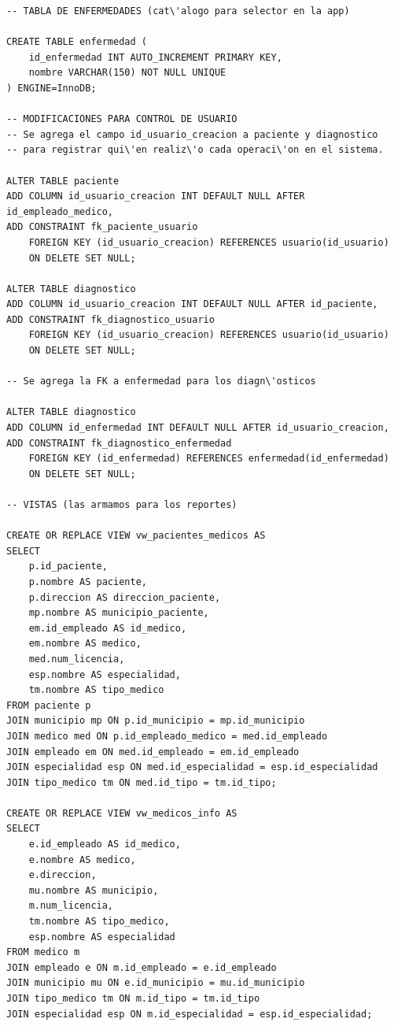 \documentclass[12pt,a4paper]{article}
\begin{document}
{\begin{verbatim}
-- TABLA DE ENFERMEDADES (cat\'alogo para selector en la app)

CREATE TABLE enfermedad (
    id_enfermedad INT AUTO_INCREMENT PRIMARY KEY,
    nombre VARCHAR(150) NOT NULL UNIQUE
) ENGINE=InnoDB;

-- MODIFICACIONES PARA CONTROL DE USUARIO
-- Se agrega el campo id_usuario_creacion a paciente y diagnostico
-- para registrar qui\'en realiz\'o cada operaci\'on en el sistema.

ALTER TABLE paciente
ADD COLUMN id_usuario_creacion INT DEFAULT NULL AFTER id_empleado_medico,
ADD CONSTRAINT fk_paciente_usuario
    FOREIGN KEY (id_usuario_creacion) REFERENCES usuario(id_usuario)
    ON DELETE SET NULL;

ALTER TABLE diagnostico
ADD COLUMN id_usuario_creacion INT DEFAULT NULL AFTER id_paciente,
ADD CONSTRAINT fk_diagnostico_usuario
    FOREIGN KEY (id_usuario_creacion) REFERENCES usuario(id_usuario)
    ON DELETE SET NULL;

-- Se agrega la FK a enfermedad para los diagn\'osticos

ALTER TABLE diagnostico
ADD COLUMN id_enfermedad INT DEFAULT NULL AFTER id_usuario_creacion,
ADD CONSTRAINT fk_diagnostico_enfermedad
    FOREIGN KEY (id_enfermedad) REFERENCES enfermedad(id_enfermedad)
    ON DELETE SET NULL;

-- VISTAS (las armamos para los reportes)

CREATE OR REPLACE VIEW vw_pacientes_medicos AS
SELECT
    p.id_paciente,
    p.nombre AS paciente,
    p.direccion AS direccion_paciente,
    mp.nombre AS municipio_paciente,
    em.id_empleado AS id_medico,
    em.nombre AS medico,
    med.num_licencia,
    esp.nombre AS especialidad,
    tm.nombre AS tipo_medico
FROM paciente p
JOIN municipio mp ON p.id_municipio = mp.id_municipio
JOIN medico med ON p.id_empleado_medico = med.id_empleado
JOIN empleado em ON med.id_empleado = em.id_empleado
JOIN especialidad esp ON med.id_especialidad = esp.id_especialidad
JOIN tipo_medico tm ON med.id_tipo = tm.id_tipo;

CREATE OR REPLACE VIEW vw_medicos_info AS
SELECT
    e.id_empleado AS id_medico,
    e.nombre AS medico,
    e.direccion,
    mu.nombre AS municipio,
    m.num_licencia,
    tm.nombre AS tipo_medico,
    esp.nombre AS especialidad
FROM medico m
JOIN empleado e ON m.id_empleado = e.id_empleado
JOIN municipio mu ON e.id_municipio = mu.id_municipio
JOIN tipo_medico tm ON m.id_tipo = tm.id_tipo
JOIN especialidad esp ON m.id_especialidad = esp.id_especialidad;


\end{verbatim}}
\end{document}
